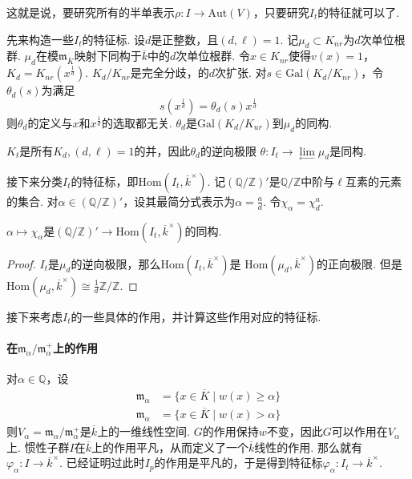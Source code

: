 这就是说，要研究所有的半单表示$\rho: I\to \mathrm{Aut}(V)$，只要研究$I_t$的特征就可以了.

先来构造一些$I_t$的特征标. 设$d$是正整数，且$(d,\ell) = 1$.
记$\mu_d \subset K_{nr}$为$d$次单位根群.
$\mu_d$在模$\mathfrak{m}_{\overline{K}}$映射下同构于$\overline{k}$中的$d$次单位根群.
令$x\in K_{nr}$使得$v(x) = 1$，$K_d = K_{nr}(x^{\frac{1}{d}})$.
$K_d/K_{nr}$是完全分歧，\tame 的$d$次扩张.
对$s\in \mathrm{Gal}(K_d/K_{nr})$，令$\theta_d(s)$为满足
\begin{equation}
    s(x^{\frac{1}{d}}) = \theta_d(s) x^{\frac{1}{d}}
\end{equation}
则$\theta_d$的定义与$x$和$x^{\frac{1}{d}}$的选取都无关.
$\theta_d$是$\mathrm{Gal}(K_d/K_{ur})$到$\mu_d$的同构.

$K_{t}$是所有$K_d,(d,\ell)=1$的并，因此$\theta_d$的逆向极限
$\theta: I_t \to \lim\limits_{\longleftarrow} \mu_d$是同构.

接下来分类$I_t$的特征标，即$\mathrm{Hom}(I_t, \overline{k}^{\times})$.
记$(\mathbb{Q}/\mathbb{Z})'$是$\mathbb{Q}/\mathbb{Z}$中阶与$\ell$互素的元素的集合.
对$\alpha \in (\mathbb{Q}/\mathbb{Z})'$，设其最简分式表示为$\alpha = \frac{a}{d}$.
令$\chi_{\alpha} = \chi_{d}^{a}$.

\begin{cprop}
    $\alpha\mapsto \chi_{\alpha}$是$(\mathbb{Q}/\mathbb{Z})'\to \mathrm{Hom}(I_t, \overline{k}^{\times})$的同构.
\end{cprop}

\begin{proof}
    $I_t$是$\mu_d$的逆向极限，那么$\mathrm{Hom}(I_t, \overline{k}^{\times})$是
    $\mathrm{Hom}(\mu_d, \overline{k}^{\times})$的正向极限.
    但是$\mathrm{Hom}(\mu_d, \overline{k}^{\times}) \cong \frac{1}{d}\mathbb{Z}/\mathbb{Z}$.
\end{proof}

接下来考虑$I_t$的一些具体的作用，并计算这些作用对应的特征标.

\paragraph{在$\mathfrak{m}_{\alpha}/\mathfrak{m}_{\alpha}^{+}$上的作用}
对$\alpha\in \mathbb{Q}$，设
\begin{align}
    \mathfrak{m}_{\alpha} &= \{x\in \overline{K}\mid w(x) \geq \alpha \} \\
    \mathfrak{m}_{\alpha} &= \{x\in \overline{K}\mid w(x) > \alpha \}
\end{align}
则$V_{\alpha} = \mathfrak{m}_{\alpha} / \mathfrak{m}_{\alpha}^{+}$是$\overline{k}$上的一维线性空间.
$G$的作用保持$w$不变，因此$G$可以作用在$V_{\alpha}$上.
惯性子群$I$在$\overline{k}$上的作用平凡，从而定义了一个$\overline{k}$线性的作用.
那么就有$\varphi_{\alpha}: I\to \overline{k}^{\times}$.
已经证明过此时$I_p$的作用是平凡的，于是得到特征标$\varphi_{\alpha}: I_t\to \overline{k}^{\times}$.

